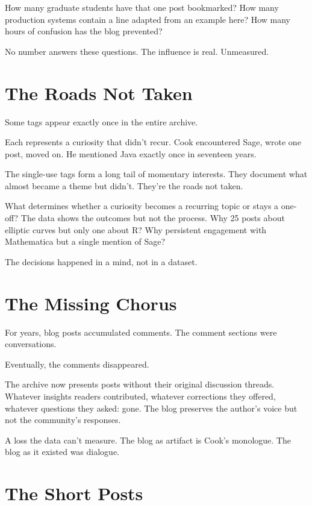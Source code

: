 How many graduate students have that one post bookmarked? How many production systems contain a line adapted from an example here? How many hours of confusion has the blog prevented?

No number answers these questions. The influence is real. Unmeasured.

\bigskip

\section*{The Roads Not Taken}

Some tags appear exactly once in the entire archive.

Each represents a curiosity that didn't recur. Cook encountered Sage, wrote one post, moved on. He mentioned Java exactly once in seventeen years.

The single-use tags form a long tail of momentary interests. They document what almost became a theme but didn't. They're the roads not taken.

What determines whether a curiosity becomes a recurring topic or stays a one-off? The data shows the outcomes but not the process. Why 25 posts about elliptic curves but only one about R? Why persistent engagement with Mathematica but a single mention of Sage?

The decisions happened in a mind, not in a dataset.

\bigskip

\section*{The Missing Chorus}

For years, blog posts accumulated comments. The comment sections were conversations.

Eventually, the comments disappeared.

The archive now presents posts without their original discussion threads. Whatever insights readers contributed, whatever corrections they offered, whatever questions they asked: gone. The blog preserves the author's voice but not the community's responses.

A loss the data can't measure. The blog as artifact is Cook's monologue. The blog as it existed was dialogue.

\bigskip

\section*{The Short Posts}

